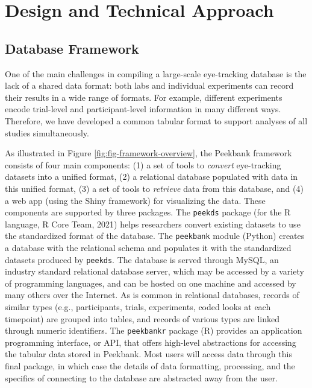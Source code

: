 \documentclass[
  english,
  man,floatsintext]{apa6}
\begin{document}
\hypertarget{design-and-technical-approach}{%
\section{Design and Technical Approach}\label{design-and-technical-approach}}

\hypertarget{database-framework}{%
\subsection{Database Framework}\label{database-framework}}

One of the main challenges in compiling a large-scale eye-tracking database is the lack of a shared data format: both labs and individual experiments can record their results in a wide range of formats.
For example, different experiments encode trial-level and participant-level information in many different ways.
Therefore, we have developed a common tabular format to support analyses of all studies simultaneously.

As illustrated in Figure \ref{fig:fig-framework-overview}, the Peekbank framework consists of four main components: (1) a set of tools to \emph{convert} eye-tracking datasets into a unified format, (2) a relational database populated with data in this unified format, (3) a set of tools to \emph{retrieve} data from this database, and (4) a web app (using the Shiny framework) for visualizing the data.
These components are supported by three packages.
The \texttt{peekds} package (for the R language, R Core Team, 2021) helps researchers convert existing datasets to use the standardized format of the database.
The \texttt{peekbank} module (Python) creates a database with the relational schema and populates it with the standardized datasets produced by \texttt{peekds}.
The database is served through MySQL, an industry standard relational database server, which may be accessed by a variety of programming languages, and can be hosted on one machine and accessed by many others over the Internet.
As is common in relational databases, records of similar types (e.g., participants, trials, experiments, coded looks at each timepoint) are grouped into tables, and records of various types are linked through numeric identifiers.
The \texttt{peekbankr} package (R) provides an application programming interface, or API, that offers high-level abstractions for accessing the tabular data stored in Peekbank.
Most users will access data through this final package, in which case the details of data formatting, processing, and the specifics of connecting to the database are abstracted away from the user.
\end{document}
